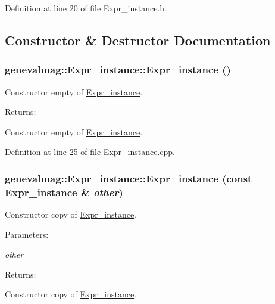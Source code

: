 Definition at line 20 of file Expr\_\-instance.h.

\subsection{Constructor \& Destructor Documentation}
\hypertarget{classgenevalmag_1_1Expr__instance_f83f87581558a7d2c05f18a1678050a2}{
\subsubsection[{Expr\_\-instance}]{\setlength{\rightskip}{0pt plus 5cm}genevalmag::Expr\_\-instance::Expr\_\-instance ()}}
\label{classgenevalmag_1_1Expr__instance_f83f87581558a7d2c05f18a1678050a2}


Constructor empty of \hyperlink{classgenevalmag_1_1Expr__instance}{Expr\_\-instance}. \begin{Desc}
\item[Returns:]\end{Desc}
Constructor empty of \hyperlink{classgenevalmag_1_1Expr__instance}{Expr\_\-instance}. 

Definition at line 25 of file Expr\_\-instance.cpp.\hypertarget{classgenevalmag_1_1Expr__instance_52ec40835f95f35c7131036873e1a14d}{
\subsubsection[{Expr\_\-instance}]{\setlength{\rightskip}{0pt plus 5cm}genevalmag::Expr\_\-instance::Expr\_\-instance (const {\bf Expr\_\-instance} \& {\em other})}}
\label{classgenevalmag_1_1Expr__instance_52ec40835f95f35c7131036873e1a14d}


Constructor copy of \hyperlink{classgenevalmag_1_1Expr__instance}{Expr\_\-instance}. \begin{Desc}
\item[Parameters:]
\begin{description}
\item[{\em other}]\end{description}
\end{Desc}
\begin{Desc}
\item[Returns:]\end{Desc}
Constructor copy of \hyperlink{classgenevalmag_1_1Expr__instance}{Expr\_\-instance}. 

